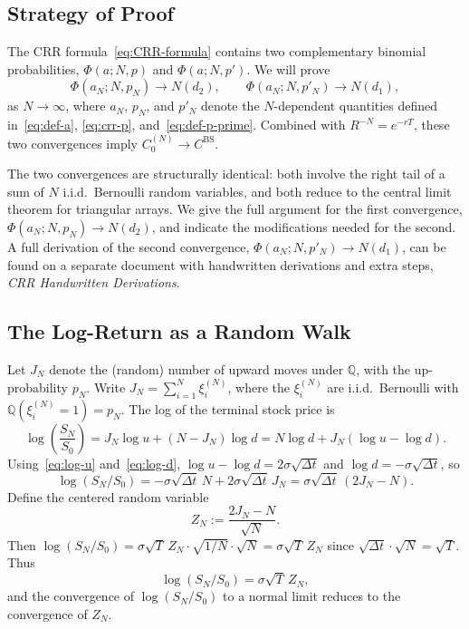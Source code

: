 \documentclass[11pt,a4paper]{article}
\theoremstyle{plain}
\theoremstyle{definition}
\newcommand{\Q}{\mathbb{Q}}
\begin{document}
\subsection{Strategy of Proof}
\label{subsec:proof-strategy}

The CRR formula~\eqref{eq:CRR-formula} contains two complementary
binomial probabilities, $\Phi(a; N, p)$ and $\Phi(a; N, p')$. We will
prove
\begin{equation}
    \label{eq:two-convergences}
    \Phi(a_N; N, p_N) \to N(d_2),
    \qquad
    \Phi(a_N; N, p'_N) \to N(d_1),
\end{equation}
as $N \to \infty$, where $a_N$, $p_N$, and $p'_N$ denote the
$N$-dependent quantities defined
in~\eqref{eq:def-a}, \eqref{eq:crr-p}, and~\eqref{eq:def-p-prime}.
Combined with $R^{-N} = e^{-rT}$, these two convergences imply
$C_0^{(N)} \to C^{\mathrm{BS}}$.

The two convergences are structurally identical: both involve the right
tail of a sum of $N$ i.i.d.\ Bernoulli random variables, and both reduce
to the central limit theorem for triangular arrays. We give the full
argument for the first convergence, $\Phi(a_N; N, p_N) \to N(d_2)$, and
indicate the modifications needed for the second. A full derivation of the second convergence, $\Phi(a_N; N, p'_N) \to N(d_1)$, can be found on a separate document with handwritten derivations and extra steps, \emph{CRR Handwritten Derivations}.

\subsection{The Log-Return as a Random Walk}
\label{subsec:random-walk}

Let $J_N$ denote the (random) number of upward moves under $\Q$, with
the up-probability $p_N$. Write
$J_N = \sum_{i=1}^{N} \xi_i^{(N)}$, where the $\xi_i^{(N)}$ are i.i.d.\
Bernoulli with $\Q(\xi_i^{(N)} = 1) = p_N$. The log of the terminal
stock price is
\begin{equation}
    \label{eq:log-S-N}
    \log\!\left(\frac{S_N}{S_0}\right)
    = J_N \log u + (N - J_N) \log d
    = N \log d + J_N (\log u - \log d).
\end{equation}
Using~\eqref{eq:log-u} and~\eqref{eq:log-d},
$\log u - \log d = 2\sigma \sqrt{\Delta t}$ and $\log d = -\sigma\sqrt{\Delta t}$,
so
\begin{equation}
    \label{eq:log-S-walk}
    \log(S_N / S_0)
    = -\sigma\sqrt{\Delta t}\, N + 2\sigma\sqrt{\Delta t}\, J_N
    = \sigma\sqrt{\Delta t}\,(2 J_N - N).
\end{equation}
Define the centered random variable
\[
Z_N := \frac{2 J_N - N}{\sqrt{N}}.
\]
Then $\log(S_N / S_0) = \sigma \sqrt{T}\, Z_N \cdot \sqrt{1/N} \cdot \sqrt{N}
= \sigma\sqrt{T}\, Z_N$ since $\sqrt{\Delta t} \cdot \sqrt{N} = \sqrt{T}$.
Thus
\begin{equation}
    \label{eq:log-S-as-Z}
    \log(S_N / S_0) = \sigma \sqrt{T}\, Z_N,
\end{equation}
and the convergence of $\log(S_N / S_0)$ to a normal limit reduces to
the convergence of $Z_N$.
\end{document}

